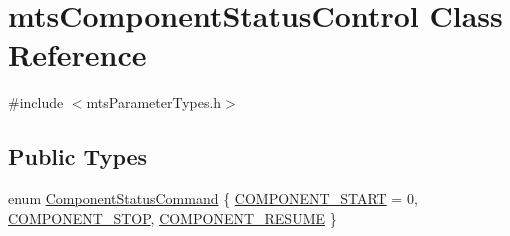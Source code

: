 \hypertarget{classmts_component_status_control}{\section{mts\-Component\-Status\-Control Class Reference}
\label{classmts_component_status_control}
}


{\ttfamily \#include $<$mts\-Parameter\-Types.\-h$>$}

\subsection*{Public Types}
\begin{DoxyCompactItemize}
\item 
enum \hyperlink{classmts_component_status_control_aaa1cc592d13ddd45a5cf695f72d3511f}{Component\-Status\-Command} \{ \hyperlink{classmts_component_status_control_aaa1cc592d13ddd45a5cf695f72d3511faf5c069fdbe1a4bbe549cb03e6ccfa2dd}{C\-O\-M\-P\-O\-N\-E\-N\-T\-\_\-\-S\-T\-A\-R\-T} = 0, 
\hyperlink{classmts_component_status_control_aaa1cc592d13ddd45a5cf695f72d3511fa5f87b3e5181ea465b2a8b2551d0800a8}{C\-O\-M\-P\-O\-N\-E\-N\-T\-\_\-\-S\-T\-O\-P}, 
\hyperlink{classmts_component_status_control_aaa1cc592d13ddd45a5cf695f72d3511faffa0f81f25fcdcfff0ceb4d0a9214cec}{C\-O\-M\-P\-O\-N\-E\-N\-T\-\_\-\-R\-E\-S\-U\-M\-E}
 \}
\end{DoxyCompactItemize}

